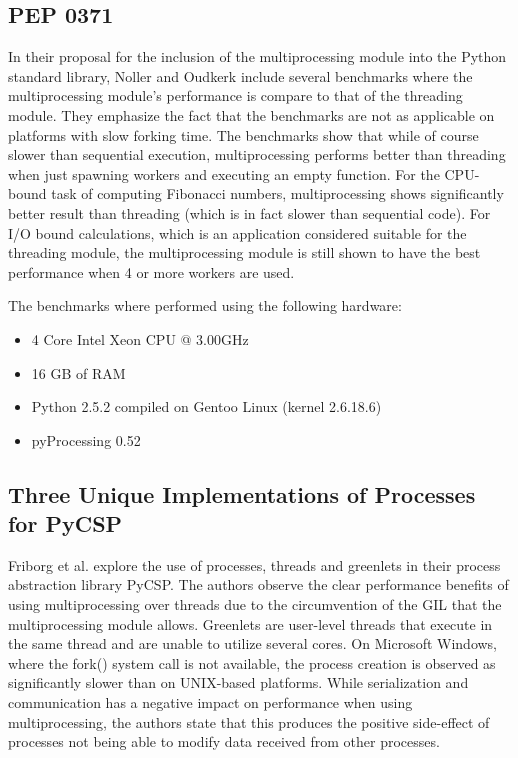 \subsection{PEP 0371}
In their proposal for the inclusion of the multiprocessing module into the Python standard library,
Noller and Oudkerk \cite{noller_pep_p0} include several benchmarks where the multiprocessing module's performance is compare to
that of the threading module. They emphasize the fact that the benchmarks are not as applicable on platforms with slow forking
time. The benchmarks show that while of course slower than sequential execution, multiprocessing performs better than
threading when just spawning workers and executing an empty function. For the CPU-bound task of computing Fibonacci numbers,
multiprocessing shows significantly better result than threading (which is in fact slower than sequential code). For I/O bound
calculations, which is an application considered suitable for the threading module, the multiprocessing module is still shown to have
the best performance when 4 or more workers are used.

The benchmarks where performed using the following hardware:
\begin{itemize}
  \item 4 Core Intel Xeon CPU @ 3.00GHz
  \item 16 GB of RAM
  \item Python 2.5.2 compiled on Gentoo Linux (kernel 2.6.18.6)
  \item pyProcessing 0.52
\end{itemize}

\subsection{Three Unique Implementations of Processes for PyCSP}
Friborg et al. \cite{friborg_2009_three_tuiopfp} explore the use of processes, threads and greenlets in their process abstraction
library PyCSP. The authors observe the clear performance benefits of using multiprocessing over threads due to the circumvention of the GIL
that the multiprocessing module allows. Greenlets are user-level threads that execute in the same thread and are unable to utilize
several cores. On Microsoft Windows, where the fork() system call is not available, the process creation is observed as
significantly slower than on UNIX-based platforms. While serialization and communication has a negative impact on performance when
using multiprocessing, the authors state that this produces the positive side-effect of processes not being able to
modify data received from other processes.

